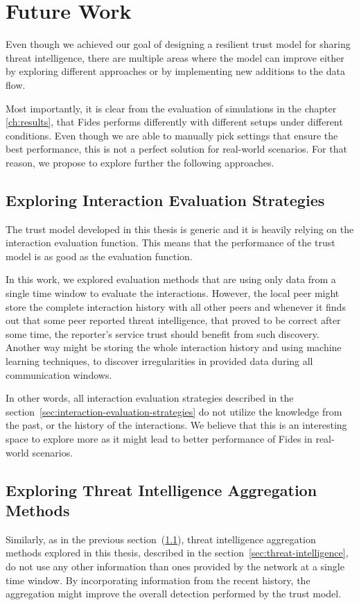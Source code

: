 \section{Future Work}
\label{sec:future-work}
Even though we achieved our goal of designing a resilient trust model for sharing threat intelligence, there are multiple areas where the model can improve either by exploring different approaches or by implementing new additions to the data flow.

Most importantly, it is clear from the evaluation of simulations in the chapter \ref{ch:results}, that Fides performs differently with different setups under different conditions.
Even though we are able to manually pick settings that ensure the best performance, this is not a perfect solution for real-world scenarios.
For that reason, we propose to explore further the following approaches.

\subsection{Exploring Interaction Evaluation Strategies}
\label{subsec:exploring-interaction-eval-strategies}
The trust model developed in this thesis is generic and it is heavily relying on the interaction evaluation function.
This means that the performance of the trust model is as good as the evaluation function.

In this work, we explored evaluation methods that are using only data from a single time window to evaluate the interactions.
However, the local peer might store the complete interaction history with all other peers and whenever it finds out that some peer reported threat intelligence, that proved to be correct after some time, the reporter's service trust should benefit from such discovery.
Another way might be storing the whole interaction history and using machine learning techniques, to discover irregularities in provided data during all communication windows.

In other words, all interaction evaluation strategies described in the section~\ref{sec:interaction-evaluation-strategies} do not utilize the knowledge from the past, or the history of the interactions.
We believe that this is an interesting space to explore more as it might lead to better performance of Fides in real-world scenarios.

\subsection{Exploring Threat Intelligence Aggregation Methods}
\label{subsec:exploring-threat-intelligence-aggregation-methods}
Similarly, as in the previous section~(\ref{subsec:exploring-interaction-eval-strategies}), threat intelligence aggregation methods explored in this thesis, described in the section~\ref{sec:threat-intelligence}, do not use any other information than ones provided by the network at a single time window.
By incorporating information from the recent history, the aggregation might improve the overall detection performed by the trust model.

